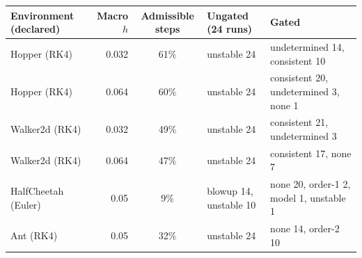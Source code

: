 \begin{tabular}{lrcll}
\toprule
Environment (declared) & Macro $h$ & Admissible steps & Ungated (24 runs) & Gated \\
\midrule
Hopper (RK4) & 0.032 & 61\% & unstable 24 & undetermined 14, consistent 10 \\
Hopper (RK4) & 0.064 & 60\% & unstable 24 & consistent 20, undetermined 3, none 1 \\
Walker2d (RK4) & 0.032 & 49\% & unstable 24 & consistent 21, undetermined 3 \\
Walker2d (RK4) & 0.064 & 47\% & unstable 24 & consistent 17, none 7 \\
HalfCheetah (Euler) & 0.05 & 9\% & blowup 14, unstable 10 & none 20, order-1 2, model 1, unstable 1 \\
Ant (RK4) & 0.05 & 32\% & unstable 24 & none 14, order-2 10 \\
\bottomrule
\end{tabular}
